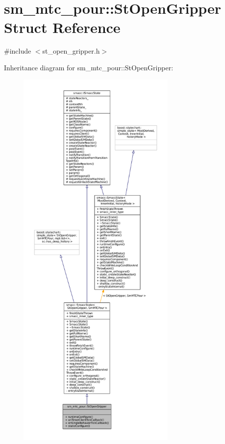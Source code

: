 \hypertarget{structsm__mtc__pour_1_1StOpenGripper}{}\section{sm\+\_\+mtc\+\_\+pour\+:\+:St\+Open\+Gripper Struct Reference}
\label{structsm__mtc__pour_1_1StOpenGripper}


{\ttfamily \#include $<$st\+\_\+open\+\_\+gripper.\+h$>$}



Inheritance diagram for sm\+\_\+mtc\+\_\+pour\+:\+:St\+Open\+Gripper\+:
\nopagebreak
\begin{figure}[H]
\begin{center}
\leavevmode
\includegraphics[height=550pt]{structsm__mtc__pour_1_1StOpenGripper__inherit__graph}
\end{center}
\end{figure}


